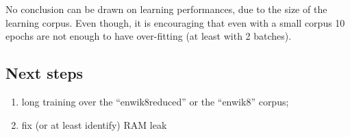 No conclusion can be drawn on learning performances, due to the size of
the learning corpus. Even though, it is encouraging that even with a
small corpus 10 epochs are not enough to have over-fitting (at least
with 2 batches).

\subsection{Next steps}

\begin{enumerate}
\def\labelenumi{\arabic{enumi}.}
\item
  long training over the ``enwik8reduced'' or the ``enwik8'' corpus;
\item
  fix (or at least identify) RAM leak
\end{enumerate}
